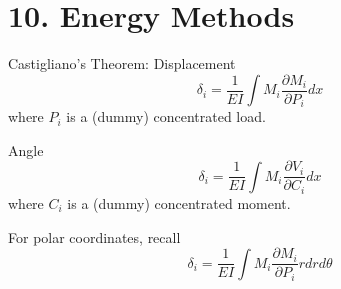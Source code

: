 \section*{10. Energy Methods}
Castigliano's Theorem:
Displacement
\begin{equation*}
    \delta_i = \frac{1}{EI} \int M_i \frac{\partial M_i}{\partial P_i}dx
\end{equation*}
where $P_i$ is a (dummy) concentrated load.

Angle 
\begin{equation*}
    \delta_i = \frac{1}{EI} \int M_i \frac{\partial V_i}{\partial C_i}dx
\end{equation*}
where $C_i$ is a (dummy) concentrated moment.

For polar coordinates, recall
\begin{equation*}
    \delta_i = \frac{1}{EI} \int M_i \frac{\partial M_i}{\partial P_i}rdrd\theta
\end{equation*}
